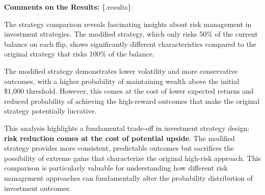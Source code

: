 \documentclass[
  letterpaper,
  DIV=11,
  numbers=noendperiod]{scrartcl}
\begin{document}
\textbf{Comments on the Results:} \{.results\}

The strategy comparison reveals fascinating insights about risk
management in investment strategies. The modified strategy, which only
risks 50\% of the current balance on each flip, shows significantly
different characteristics compared to the original strategy that risks
100\% of the balance.

The modified strategy demonstrates lower volatility and more
conservative outcomes, with a higher probability of maintaining wealth
above the initial \$1,000 threshold. However, this comes at the cost of
lower expected returns and reduced probability of achieving the
high-reward outcomes that make the original strategy potentially
lucrative.

This analysis highlights a fundamental trade-off in investment strategy
design: \textbf{risk reduction comes at the cost of potential upside}.
The modified strategy provides more consistent, predictable outcomes but
sacrifices the possibility of extreme gains that characterize the
original high-risk approach. This comparison is particularly valuable
for understanding how different risk management approaches can
fundamentally alter the probability distribution of investment outcomes.
\end{document}

